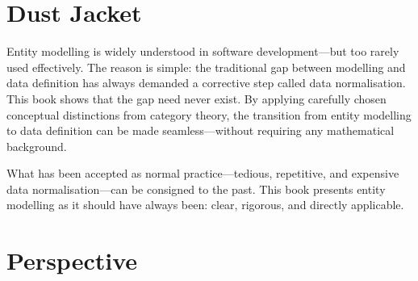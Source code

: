 \section{Dust Jacket}

Entity modelling is widely understood in software development—but too rarely used effectively. The reason is simple: the traditional gap between modelling and data definition has always demanded a corrective step called data normalisation. This book shows that the gap need never exist. By applying carefully chosen conceptual distinctions from category theory, the transition from entity modelling to data definition can be made seamless—without requiring any mathematical background.

What has been accepted as normal practice—tedious, repetitive, and expensive data normalisation—can be consigned to the past. This book presents entity modelling as it should have always been: clear, rigorous, and directly applicable.

\section{Perspective}

\label{Perspective}

